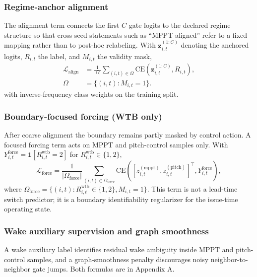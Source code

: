 \documentclass[
  11pt]{article}
\begin{document}
\subsubsection{Regime-anchor alignment}\label{regime-anchor-alignment}

The alignment term connects the first \(C\) gate logits to the declared
regime structure so that cross-seed statements such as ``MPPT-aligned''
refer to a fixed mapping rather than to post-hoc relabeling. With
\(\mathbf{z}^{(1:C)}_{i,t}\) denoting the anchored logits, \(R_{i,t}\)
the label, and \(M_{i,t}\) the validity mask, \[
\begin{aligned}
\mathcal{L}_{\mathrm{align}}
&= \frac{1}{|\Omega|}
\sum_{(i,t)\in\Omega}
\mathrm{CE}\!\left(\mathbf{z}^{(1:C)}_{i,t}, R_{i,t}\right),\\
\Omega&=\{(i,t):M_{i,t}=1\}.
\end{aligned}
\] with inverse-frequency class weights on the training split.

\subsubsection{Boundary-focused forcing (WTB
only)}\label{boundary-focused-forcing-wtb-only}

After coarse alignment the boundary remains partly masked by control
action. A focused forcing term acts on MPPT and pitch-control samples
only. With
\(Y^{\mathrm{force}}_{i,t}=\mathbf{1}[R^{\mathrm{wtb}}_{i,t}=2]\) for
\(R^{\mathrm{wtb}}_{i,t}\in\{1,2\}\),
\[\mathcal{L}_{\mathrm{force}} = \frac{1}{|\Omega_{\mathrm{force}}|}\sum_{(i,t)\in\Omega_{\mathrm{force}}}\mathrm{CE}\!\left(\left[z^{(\mathrm{mppt})}_{i,t}, z^{(\mathrm{pitch})}_{i,t}\right]^{\top}, Y^{\mathrm{force}}_{i,t}\right),\]
where
\(\Omega_{\mathrm{force}}=\{(i,t):R^{\mathrm{wtb}}_{i,t}\in\{1,2\}, M_{i,t}=1\}\).
This term is not a lead-time switch predictor; it is a boundary
identifiability regularizer for the issue-time operating state.

\subsubsection{Wake auxiliary supervision and graph
smoothness}\label{wake-auxiliary-supervision-and-graph-smoothness}

A wake auxiliary label identifies residual wake ambiguity inside MPPT
and pitch-control samples, and a graph-smoothness penalty discourages
noisy neighbor-to-neighbor gate jumps. Both formulas are in Appendix A.
\end{document}
